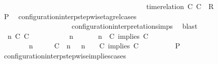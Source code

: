 \begin{isabellebody}
\ \ \ \ \ \ \ \ \ \ \ \ \ \ \ \ \ \ \ \ \ \ \ \ \ \ \ \ \ \ \ \ \ \ \ \ \ \ {\isasymturnstile}\ {\isasymPsi}\ {\isasymtriangleright}\ {\isacharparenleft}{\isacharparenleft}time{\isacharminus}relation\ {\isasymlfloor}C\ C\ {\isasymin}\ R{\isacharparenright}\ {\isacharhash}\ {\isasymPhi}{\isacharparenright}{\isacharparenright}{\isacartoucheclose}\isanewline
\ \ \ \ \ \ \isamarkupfalse%
\ {\isacharquery}P\ \isamarkupfalse%
\ configuration{\isacharunderscore}interp{\isacharunderscore}stepwise{\isacharunderscore}tagrel{\isacharunderscore}cases\isanewline
\ \ \ \ \ \ \ \ \ \ \ \ \ \ \ \ \ \ \ \ configuration{\isacharunderscore}interpretation{\isachardot}simps\ \isamarkupfalse%
\ blast\isanewline
\ \ \ \ \isamarkupfalse%
\isanewline
\ \ \ \ \ \ \isamarkupfalse%
\ {\isasymGamma}\ n\ C\ C\ {\isasymPsi}\ {\isasymPhi}\isanewline
\ \ \ \ \ \ \isamarkupfalse%
\ {\isacartoucheopen}{\isacharparenleft}{\isasymGamma}\ n\ {\isasymturnstile}\ {\isasymPsi}\ {\isasymtriangleright}\ {\isasymPhi}\ {\isacharequal}\ {\isacharparenleft}{\isasymGamma}{\isacharcomma}\ n\ {\isasymturnstile}\ {\isacharparenleft}C\ implies\ C\ {\isacharhash}\ {\isasymPsi}\ {\isasymtriangleright}\ {\isasymPhi}{\isacharparenright}{\isacartoucheclose}\isanewline
\ \ \ \ \ \ \ {\isacartoucheopen}{\isacharparenleft}{\isasymGamma}\ n\ {\isasymturnstile}\ {\isasymPsi}\ {\isasymtriangleright}\ {\isasymPhi}\ {\isacharequal}\ {\isacharparenleft}{\isacharparenleft}{\isacharparenleft}C\ {\isasymnot}{\isasymUp}\ n{\isacharparenright}\ {\isacharhash}\ {\isasymGamma}{\isacharparenright}{\isacharcomma}\ n\ {\isasymturnstile}\ {\isasymPsi}\ {\isasymtriangleright}\ {\isacharparenleft}{\isacharparenleft}C\ implies\ C\ {\isacharhash}\ {\isasymPhi}{\isacharparenright}{\isacharparenright}{\isacartoucheclose}\isanewline
\ \ \ \ \ \ \isamarkupfalse%
\ {\isacharquery}P\ \isamarkupfalse%
\ configuration{\isacharunderscore}interp{\isacharunderscore}stepwise{\isacharunderscore}implies{\isacharunderscore}cases\isanewline

\end{isabellebody}
